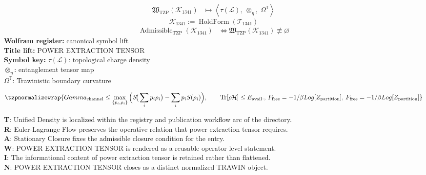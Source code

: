 \noindent
\begin{minipage}[t]{0.48\linewidth}
\begingroup
\small
\[
\begin{aligned}
\mathfrak{W}_{\mathrm{TZP}}\!\left(\mathcal{K}_{1341}\right)
&\longmapsto
\left\langle \tau(\mathcal{L}),\; \otimes_{\eta},\; \Omega^{\mathbb{T}} \right\rangle
\end{aligned}
\]
\[
\mathcal{K}_{1341}
:=
\operatorname{HoldForm}\!\left(\mathcal{T}_{1341}\right)
\]
\[
\begin{aligned}
\operatorname{Admissible}_{\mathrm{TZP}}\!\left(\mathcal{K}_{1341}\right)
&\Longleftrightarrow
\mathfrak{W}_{\mathrm{TZP}}\!\left(\mathcal{K}_{1341}\right)\not\equiv\varnothing
\end{aligned}
\]
\textbf{Wolfram register:} canonical symbol lift\\
\textbf{Title lift:} POWER EXTRACTION TENSOR\\
\textbf{Symbol key:} \(\tau(\mathcal{L})\): topological charge density\\ \(\otimes_{\eta}\): entanglement tensor map\\ \(\Omega^{\mathbb{T}}\): Trawinistic boundary curvature
\par
\endgroup
\end{minipage}\hfill
\begin{minipage}[t]{0.48\linewidth}
\[
\tzpnormalizewrap{Gamma_{\rm channel} \le \max_{\{p_i,\rho_i\}}\Big( S\!\big(\sum_i p_i\rho_i\big)-\sum_i p_i S(\rho_i)\Big), \qquad \mathrm{Tr}[\rho \mathcal H]\le E_{\rm avail}.,\,F_{\mathrm{free}} = -1/\beta Log[Z_{\mathrm{partition}}],\,F_{\mathrm{free}} = -1/\beta Log[Z_{\mathrm{partition}}]}
\]

\small
\textbf{T}: Unified Density is localized within the registry and publication workflow arc of the directory.\\
\textbf{R}: Euler-Lagrange Flow preserves the operative relation that power extraction tensor requires.\\
\textbf{A}: Stationary Closure fixes the admissible closure condition for the entry.\\
\textbf{W}: POWER EXTRACTION TENSOR is rendered as a reusable operator-level statement.\\
\textbf{I}: The informational content of power extraction tensor is retained rather than flattened.\\
\textbf{N}: POWER EXTRACTION TENSOR closes as a distinct normalized TRAWIN object.
\normalsize
\end{minipage}

